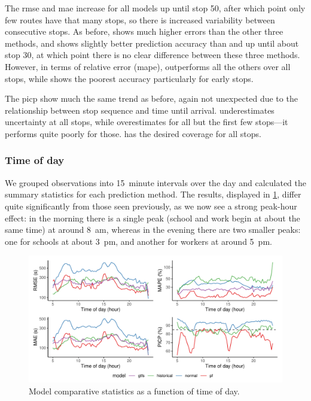 The \gls{rmse} and \gls{mae} increase for all models up until stop 50, after which point only few routes have that many stops, so there is increased variability between consecutive stops. As before, \Fnorm{} shows much higher errors than the other three methods, and \Fpf{} shows slightly better prediction accuracy than \Fhist{} and \Fsched{} up until about stop 30, at which point there is no clear difference between these three methods. However, in terms of relative error (\gls{mape}), \Fpf{} outperforms all the others over all stops, while \Fhist{} shows the poorest accuracy particularly for early stops.


The \gls{picp} show much the same trend as before, again not unexpected due to the relationship between stop sequence and time until arrival. \Fpf{} underestimates uncertainty at all stops, while \Fnorm{} overestimates for all but the first few stops---it performs quite poorly for those. \Fhist{} has the desired coverage for all stops.



\subsubsection{Time of day}

We grouped observations into 15~minute intervals over the day and calculated the summary statistics for each prediction method. The results, displayed in \cref{fig:model_results_rmse_timeofday}, differ quite significantly from those seen previously, as we now see a strong peak-hour effect: in the morning there is a single peak (school and work begin at about the same time) at around 8~am, whereas in the evening there are two smaller peaks: one for schools at about 3~pm, and another for workers at around 5~pm.


\begin{knitrout}\small
{}\color{fgcolor}\begin{figure}
\includegraphics[width=\textwidth]{figure/model_results_rmse_timeofday-1} \caption[Model comparative statistics as a function of time of day]{Model comparative statistics as a function of time of day.}\label{fig:model_results_rmse_timeofday}
\end{figure}


\end{knitrout}

